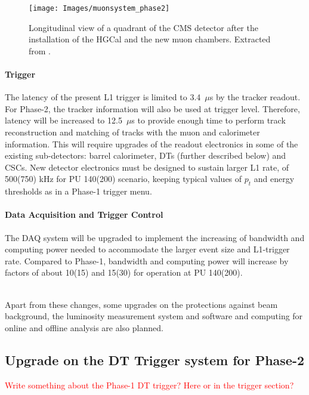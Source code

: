 \documentclass[../main.tex]{subfiles}
\begin{document}
\begin{figure}[h!]
\begin{center}
\texttt{[image: Images/muonsystem\_phase2]}
\end{center}
\caption{Longitudinal view of a quadrant of the CMS detector after the installation of the HGCal and the new muon chambers. Extracted from \cite{l1tdr}.}
\label{intro:fig:muon_phase2}
\end{figure}


\paragraph{Trigger}

The latency of the present L1 trigger is limited to 3.4~$\mu$s by the tracker readout. For Phase-2, the tracker information will also be used at trigger level. Therefore, latency will be increased to 12.5~$\mu$s to provide enough time to perform track reconstruction and matching of tracks with the muon and calorimeter information. This will require upgrades of the readout electronics in some of the existing sub-detectors: barrel calorimeter, DTs (further described below) and CSCs. New detector electronics must be designed to sustain larger L1 rate, of 500(750) kHz for PU 140(200) scenario, keeping typical values of $p_t$ and energy thresholds as in a Phase-1 trigger menu.

\paragraph{Data Acquisition and Trigger Control}

The DAQ system will be upgraded to implement the increasing of bandwidth and computing power needed to accommodate the larger event size and L1-trigger rate. Compared to Phase-1, bandwidth and computing power will increase by factors of about 10(15) and 15(30) for operation at PU 140(200).

~\\Apart from these changes, some upgrades on the protections against beam background, the luminosity measurement system and software and computing for online and offline analysis are also planned. 


\subsection{Upgrade on the DT Trigger system for Phase-2}

\textcolor{red}{Write something about the Phase-1 DT trigger? Here or in the trigger section?}
\end{document}
